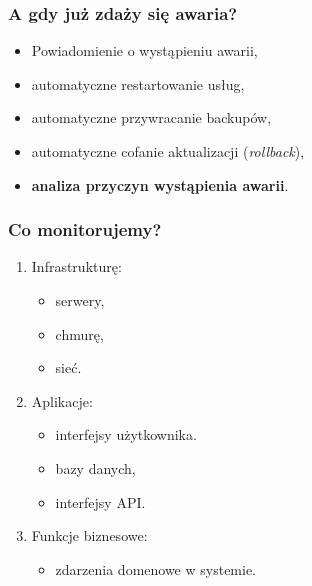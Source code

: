\documentclass[]{beamer}
\begin{document}
\begin{frame}
  \frametitle{A gdy już zdaży się awaria?}

  \vspace{-1cm}
  \begin{itemize}
    \item Powiadomienie o wystąpieniu awarii,
    \item automatyczne restartowanie usług,
    \item automatyczne przywracanie backupów,
    \item automatyczne cofanie aktualizacji (\textit{rollback}),
    \item \textbf{analiza przyczyn wystąpienia awarii}.
  \end{itemize}
\end{frame}

\begin{frame}
  \frametitle{Co monitorujemy? \cite{gartner}} 

  \vspace{-1cm}
  \begin{enumerate}
    \item Infrastrukturę:
      \begin{itemize}
        \item serwery,
        \item chmurę,
        \item sieć.
      \end{itemize}
    \item Aplikacje:
      \begin{itemize}
        \item interfejsy użytkownika.
        \item bazy danych,
        \item interfejsy API.
      \end{itemize}
    \item Funkcje biznesowe:
      \begin{itemize}
        \item zdarzenia domenowe w systemie.
      \end{itemize}
  \end{enumerate}
\end{frame}
\end{document}
